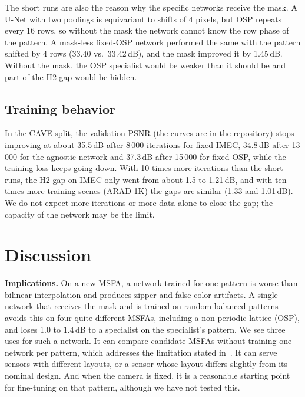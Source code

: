 \documentclass{article}
\begin{document}
The short runs are also the reason why the specific networks receive the
mask. A U-Net with two poolings is equivariant to shifts of 4 pixels, but
OSP repeats every 16 rows, so without the mask the network cannot know the
row phase of the pattern. A mask-less fixed-OSP network performed the same
with the pattern shifted by 4 rows (33.40 vs.\ 33.42\,dB), and the mask
improved it by 1.45\,dB. Without the mask, the OSP specialist would be
weaker than it should be and part of the H2 gap would be hidden.

\subsection{Training behavior}

In the CAVE split, the validation PSNR (the curves are in the repository)
stops improving at about 35.5\,dB after 8\,000 iterations for fixed-IMEC,
34.8\,dB after 13\,000 for the agnostic network and 37.3\,dB after 15\,000
for fixed-OSP, while the training loss keeps going down. With 10 times more
iterations than the short runs, the H2 gap on IMEC only went from about 1.5
to 1.21\,dB, and with ten times more training scenes (ARAD-1K) the gaps are
similar (1.33 and 1.01\,dB). We do not expect more iterations or more data
alone to close the gap; the capacity of the network may be the limit.

\section{Discussion}
\label{sec:discussion}

\textbf{Implications.} On a new MSFA, a network trained for one pattern is
worse than bilinear interpolation and produces zipper and false-color
artifacts. A single network that receives the mask and is trained on random
balanced patterns avoids this on four quite different MSFAs, including a
non-periodic lattice (OSP), and loses 1.0 to 1.4\,dB to a specialist on the
specialist's pattern. We see three uses for such a network. It can compare
candidate MSFAs without training one network per pattern, which addresses
the limitation stated in~\cite{diaz2023}. It can serve sensors with
different layouts, or a sensor whose layout differs slightly from its
nominal design. And when the camera is fixed, it is a reasonable starting
point for fine-tuning on that pattern, although we have not tested this.
\end{document}
